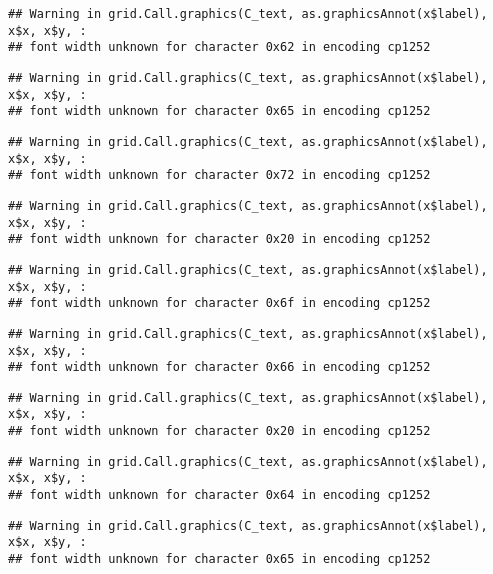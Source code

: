 \documentclass[
]{article}
\begin{document}
\begin{verbatim}
## Warning in grid.Call.graphics(C_text, as.graphicsAnnot(x$label), x$x, x$y, :
## font width unknown for character 0x62 in encoding cp1252
\end{verbatim}

\begin{verbatim}
## Warning in grid.Call.graphics(C_text, as.graphicsAnnot(x$label), x$x, x$y, :
## font width unknown for character 0x65 in encoding cp1252
\end{verbatim}

\begin{verbatim}
## Warning in grid.Call.graphics(C_text, as.graphicsAnnot(x$label), x$x, x$y, :
## font width unknown for character 0x72 in encoding cp1252
\end{verbatim}

\begin{verbatim}
## Warning in grid.Call.graphics(C_text, as.graphicsAnnot(x$label), x$x, x$y, :
## font width unknown for character 0x20 in encoding cp1252
\end{verbatim}

\begin{verbatim}
## Warning in grid.Call.graphics(C_text, as.graphicsAnnot(x$label), x$x, x$y, :
## font width unknown for character 0x6f in encoding cp1252
\end{verbatim}

\begin{verbatim}
## Warning in grid.Call.graphics(C_text, as.graphicsAnnot(x$label), x$x, x$y, :
## font width unknown for character 0x66 in encoding cp1252
\end{verbatim}

\begin{verbatim}
## Warning in grid.Call.graphics(C_text, as.graphicsAnnot(x$label), x$x, x$y, :
## font width unknown for character 0x20 in encoding cp1252
\end{verbatim}

\begin{verbatim}
## Warning in grid.Call.graphics(C_text, as.graphicsAnnot(x$label), x$x, x$y, :
## font width unknown for character 0x64 in encoding cp1252
\end{verbatim}

\begin{verbatim}
## Warning in grid.Call.graphics(C_text, as.graphicsAnnot(x$label), x$x, x$y, :
## font width unknown for character 0x65 in encoding cp1252
\end{verbatim}
\end{document}
